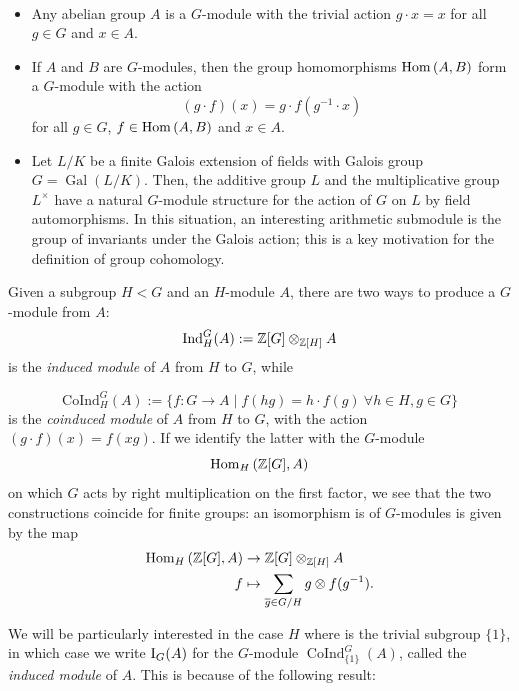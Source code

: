 \documentclass[a4paper, oneside]{memoir}
\begin{document}
\begin{example}[$G$-modules]\
	\begin{itemize}
		\item Any abelian group $A$ is a $G$-module with the trivial action $g\cdot x=x$ for all $g\in G$ and $x\in A$.
		\item If $A$ and $B$ are $G$-modules, then the group homomorphisms $\operatorname{Hom}{(A,B)}$ form a $G$-module with the action
		      \[
			      (g\cdot f)(x)=g\cdot f(g^{-1}\cdot x)
		      \]
		      for all $g\in G$, $f\in\operatorname{Hom}{(A,B)}$ and $x\in A$.
		\item Let $L / K$ be a finite Galois extension of fields with Galois group $G=\operatorname{Gal}{(L / K)}$. Then, the additive group $L$ and the multiplicative group $L^\times$ have a natural $G$-module structure for the action of $G$ on $L$ by field automorphisms. In this situation, an interesting arithmetic submodule is the group of invariants under the Galois action; this is a key motivation for the definition of group cohomology.
	\end{itemize}
\end{example}


Given a subgroup $H<G$ and an $H$-module $A$, there are two ways to produce a $G$-module from $A$:
\[
	\mathrm{Ind}^G_H{(A)}:=\mathbb{Z}[G]\otimes_{\mathbb{Z}[H]}{A}
\]
is the \textit{induced module} of $A$ from $H$ to $G$, while

\[
	\mathrm{CoInd}^G_H{(A)}:=\{f:G\to A \mid f(hg)=h\cdot f(g) ~\forall h\in H, g\in G\}
\]
is the \textit{coinduced module} of $A$ from $H$ to $G$, with the action $(g \cdot f)(x)=f(xg)$. If we identify the latter with the $G$-module
\[
	\operatorname{Hom}_H{(\mathbb{Z}[G],A)}
\]
on which $G$ acts by right multiplication on the first factor, we see that the two constructions coincide for finite groups: an isomorphism is of $G$-modules is given by the map
\begin{equation}\label{eq:IndIso}
	\begin{aligned}
		\operatorname{Hom}_H{(\mathbb{Z}[G],A)} & \to \mathbb{Z}[G]\otimes_{\mathbb{Z}[H]}{A}                               \\
		f                 & \mapsto \sum_{\overline{g} \in G / H}{g\otimes f(g^{-1})}.
	\end{aligned}
\end{equation}

We will be particularly interested in the case $H$ where is the trivial subgroup $\{1\}$, in which case we write $\operatorname{I}_{G}(A)$ for the $G$-module $\operatorname{CoInd}^G_{\{1\}}{(A)}$, called the \textit{induced module} of $A$. This is because of the following result:
\end{document}
